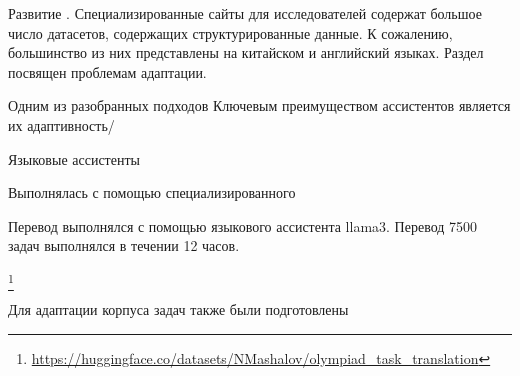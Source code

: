 Развитие . Специализированные сайты для исследователей содержат
большое число датасетов, содержащих структурированные данные. К сожалению, большинство из
них представлены на китайском и английский языках. 
Раздел посвящен проблемам адаптации.

Одним из разобранных подходов Ключевым преимуществом ассистентов является их адаптивность/

Языковые ассистенты 

Выполнялась с помощью специализированного 

Перевод выполнялся с помощью языкового ассистента llama3. Перевод 7500 задач выполнялся в течении 12 часов.

\footnote{\url{https://huggingface.co/datasets/NMashalov/olympiad_task_translation}}



Для адаптации корпуса задач также были подготовлены



